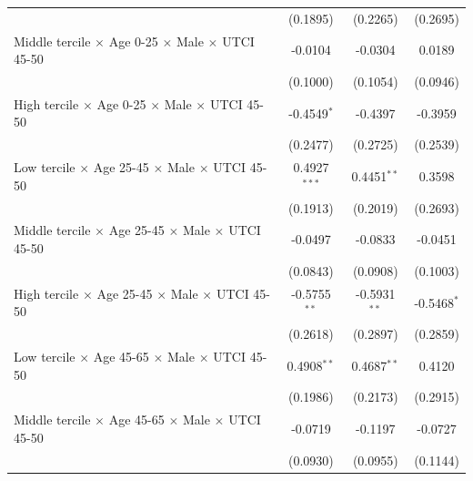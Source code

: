 \begin{table}[htbp]
\begin{tabular}{lccc}
                                                                                & (0.1895)        & (0.2265)          & (0.2695)\\   
      Middle tercile $\times$ Age 0-25 $\times$ Male $\times$ UTCI 45-50        & -0.0104         & -0.0304           & 0.0189\\   
                                                                                & (0.1000)        & (0.1054)          & (0.0946)\\   
      High tercile $\times$ Age 0-25 $\times$ Male $\times$ UTCI 45-50          & -0.4549$^{*}$   & -0.4397           & -0.3959\\   
                                                                                & (0.2477)        & (0.2725)          & (0.2539)\\   
      Low tercile $\times$ Age 25-45 $\times$ Male $\times$ UTCI 45-50          & 0.4927$^{***}$  & 0.4451$^{**}$     & 0.3598\\   
                                                                                & (0.1913)        & (0.2019)          & (0.2693)\\   
      Middle tercile $\times$ Age 25-45 $\times$ Male $\times$ UTCI 45-50       & -0.0497         & -0.0833           & -0.0451\\   
                                                                                & (0.0843)        & (0.0908)          & (0.1003)\\   
      High tercile $\times$ Age 25-45 $\times$ Male $\times$ UTCI 45-50         & -0.5755$^{**}$  & -0.5931$^{**}$    & -0.5468$^{*}$\\   
                                                                                & (0.2618)        & (0.2897)          & (0.2859)\\   
      Low tercile $\times$ Age 45-65 $\times$ Male $\times$ UTCI 45-50          & 0.4908$^{**}$   & 0.4687$^{**}$     & 0.4120\\   
                                                                                & (0.1986)        & (0.2173)          & (0.2915)\\   
      Middle tercile $\times$ Age 45-65 $\times$ Male $\times$ UTCI 45-50       & -0.0719         & -0.1197           & -0.0727\\   
                                                                                & (0.0930)        & (0.0955)          & (0.1144)\\   

\end{tabular}
\end{table}
